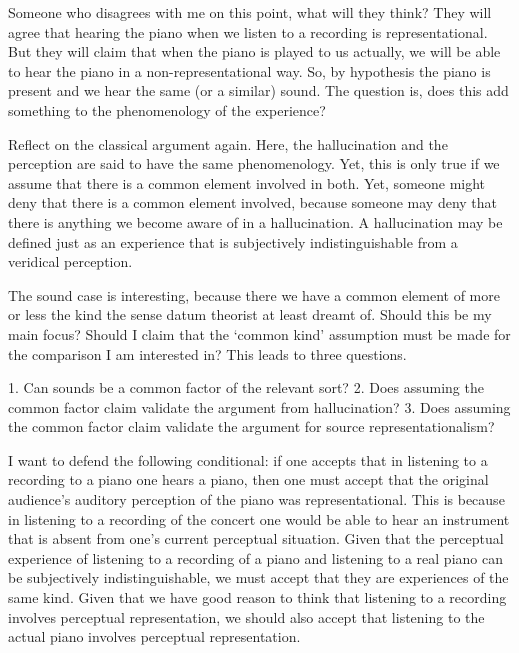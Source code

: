 \documentclass[sloppy, journal, git, bytitle, dodraft]{humapap}
\begin{document}
Someone who disagrees with me on this point, what will they think? They will agree that hearing the piano when we listen to a recording is representational. But they will claim that when the piano is played to us actually, we will be able to hear the piano in a non-representational way. So, by hypothesis the piano is present and we hear the same (or a similar) sound. The question is, does this add something to the phenomenology of the experience? 

Reflect on the classical argument again. Here, the hallucination and the perception are said to have the same phenomenology. Yet, this is only true if we assume that there is a common element involved in both. Yet, someone might deny that there is a common element involved, because someone may deny that there is anything we become aware of in a hallucination. A hallucination may be defined just as an experience that is subjectively indistinguishable from a veridical perception. 

The sound case is interesting, because there we have a common element of more or less the kind the sense datum theorist at least dreamt of. Should this be my main focus? Should I claim that the `common kind' assumption must be made for the comparison I am interested in? This leads to three questions. 

1. Can sounds be a common factor of the relevant sort?
2. Does assuming the common factor claim validate the argument from hallucination? 
3. Does assuming the common factor claim validate the argument for source representationalism? 
 

\sect



I want to defend the following conditional: if one accepts that in listening to a recording to a piano one hears a piano, then one must accept that the original audience’s auditory perception of the piano was representational. This is because in listening to a recording of the concert one would be able to hear an instrument that is absent from one’s current perceptual situation. Given that the perceptual experience of listening to a recording of a piano and listening to a real piano can be subjectively indistinguishable, we must accept that they are experiences of the same kind. Given that we have good reason to think that listening to a recording involves perceptual representation, we should also accept that listening to the actual piano involves perceptual representation. 
\end{document}
